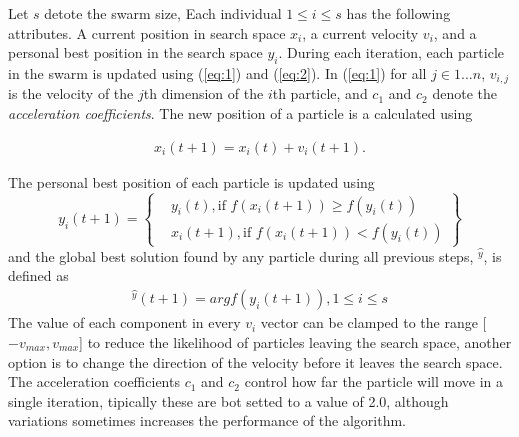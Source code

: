 \documentclass[journal]{IEEEtran}
\begin{document}
Let $s$ detote the swarm size, Each individual $1 \leq i \leq s$ has the following attributes. A current position in search space $x_i$, a current velocity $v_i$, and a personal best position in the search space $y_i$. During each iteration, each particle in the swarm is updated using (\ref{eq:1}) and (\ref{eq:2}). In (\ref{eq:1}) for all $j\in1...n$, $v_{i,j}$ is the velocity of the $j$th dimension of the $i$th particle, and $c_1$ and $c_2$ denote the \textit{acceleration coefficients}. The new position of a particle is a calculated using

\begin{equation} \label{eq:2}
    \begin{aligned}
        x_i(t+1)=x_i(t)+v_i(t+1).
    \end{aligned}
\end{equation}

The personal best position of each particle is updated using
\begin{equation} \label{eq:3}
y_i(t+1) = \left\{
  \begin{aligned}
    &y_i(t), \text{if } f(x_i(t+1))\geq f(y_i(t)) \\
    &x_i(t+1), \text{if } f(x_i(t+1))<f(y_i(t))
  \end{aligned}
\right\}
\end{equation}
and the global best solution found by any particle during all previous steps, $\hat{^y}$, is defined as
\begin{equation} \label{eq:4}
    \begin{aligned}
        \hat{^y}(t+1)=arg f(y_i(t+1)), 1\leq i \leq s
    \end{aligned}
\end{equation}
The value of each component in every $v_i$ vector can be clamped to the range [$-v_{max},v_{max}$] to reduce the likelihood of particles leaving the search space, another option is to change the direction of the velocity before it leaves the search space. The acceleration coefficients $c_1$ and $c_2$ control how far the particle will move in a single iteration, tipically these are bot setted to a value of 2.0, although variations sometimes increases the performance of the algorithm.
\end{document}
